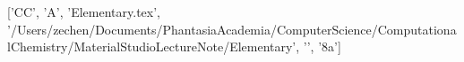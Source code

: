 ['CC', 'A', 'Elementary.tex', '/Users/zechen/Documents/PhantasiaAcademia/ComputerScience/ComputationalChemistry/MaterialStudioLectureNote/Elementary', '', '\x8a\xbd{}\xaf{}\xba{}']

